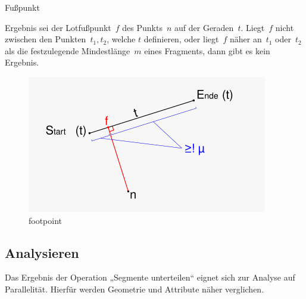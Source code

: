 \documentclass[../main/thesis.tex]{subfiles}
\begin{document}
\begin{algorithm}[H]
\caption{Fußpunkt}\label{alg:Fusspunkt}
\begin{algorithmic}
	\State Ergebnis sei der Lotfußpunkt~$f$ des Punkts~$n$ auf der Geraden~$t$. Liegt~$f$ nicht zwischen den Punkten~$t_1, t_2$, welche $t$ definieren, oder liegt~$f$ näher an~$t_1$ oder~$t_2$ als die festzulegende Mindestlänge~$m$ eines Fragments, dann gibt es kein Ergebnis.
\EndFunction
\end{algorithmic}
\end{algorithm}

\begin{figure}[ht]
    \centering
    \includegraphics[width=\ScaleIfNeeded]{../chapter4/footpoint}
    \caption{footpoint}\label{fig:footpoint}
\end{figure}

\subsection{Analysieren}

Das Ergebnis der Operation „Segmente unterteilen“ eignet sich zur Analyse auf Parallelität.
Hierfür werden Geometrie und Attribute näher verglichen.

\end{document}

